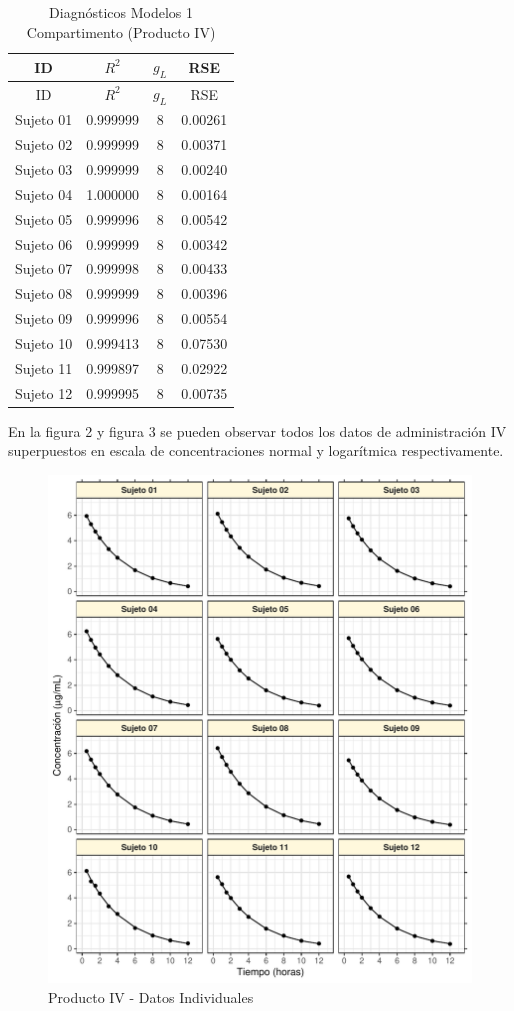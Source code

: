 \documentclass[]{article}
\begin{document}
\begin{longtable}[]{@{}cccc@{}}
\caption{Diagnósticos Modelos 1 Compartimento (Producto
IV)}\tabularnewline
\toprule
ID & \(R^{2}\) & \(g_{L}\) & RSE\tabularnewline
\midrule
\endfirsthead
\toprule
ID & \(R^{2}\) & \(g_{L}\) & RSE\tabularnewline
\midrule
\endhead
Sujeto 01 & 0.999999 & 8 & 0.00261\tabularnewline
Sujeto 02 & 0.999999 & 8 & 0.00371\tabularnewline
Sujeto 03 & 0.999999 & 8 & 0.00240\tabularnewline
Sujeto 04 & 1.000000 & 8 & 0.00164\tabularnewline
Sujeto 05 & 0.999996 & 8 & 0.00542\tabularnewline
Sujeto 06 & 0.999999 & 8 & 0.00342\tabularnewline
Sujeto 07 & 0.999998 & 8 & 0.00433\tabularnewline
Sujeto 08 & 0.999999 & 8 & 0.00396\tabularnewline
Sujeto 09 & 0.999996 & 8 & 0.00554\tabularnewline
Sujeto 10 & 0.999413 & 8 & 0.07530\tabularnewline
Sujeto 11 & 0.999897 & 8 & 0.02922\tabularnewline
Sujeto 12 & 0.999995 & 8 & 0.00735\tabularnewline
\bottomrule
\end{longtable}

En la figura 2 y figura 3 se pueden observar todos los datos de
administración IV superpuestos en escala de concentraciones normal y
logarítmica respectivamente.

\begin{figure}[H]

{\centering \includegraphics{parcial_1_files/figure-latex/unnamed-chunk-4-1} 

}

\caption{Producto IV - Datos Individuales}\label{fig:unnamed-chunk-4}
\end{figure}
\end{document}

